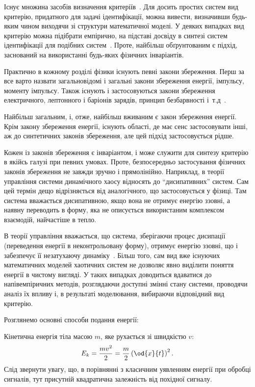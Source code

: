 Існує множина засобів визначення
критеріїв~\cite{atu_asau11,atu_asau12,atu_asau14,atu_khar_autodor25,atu_asau18,atu_st79,atu_apir2013}.
Для досить простих систем вид критерію, придатного для задачі ідентифікації,
можна вивести, визначивши будь-яким чином виходячи зі структури математичної
моделі. У деяких випадках вид критерію можна підібрати емпірично, на
підставі досвіду в синтезі систем ідентифікації для подібних систем~\cite{atu_asau24}. Проте,
найбільш обґрунтованим є підхід, заснований на використанні будь-яких фізичних
інваріантів.



Практично в кожному розділі фізики існують певні закони
збереження. Перш за все варто назвати загальновідомі і загальні
закони збереження енергії, імпульсу, моменту імпульсу. Також
існують і застосовуються закони збереження електричного,
лептонного і баріонів зарядів, принцип безбарвності
і~т.д~\cite{vigner_invar}.

Найбільш загальним, і, отже, найбільш вживаним є закон збереження енергії.
Крім закону збереження енергії, існують області, де має сенс
застосовувати інші, аж до синтетичних законів збереження, але
цей підхід застосовується рідше.

Кожен із законів збереження є інваріантом, і може служити для
синтезу критерію в якійсь галузі при певних умовах. Проте,
безпосередньо застосування фізичних законів збереження не
завжди зручно і прямолінійно. Наприклад, в теорії управління
системи динамічного хаосу відносять до ``дисипативних''
систем. Сам цей термін дещо відрізняється від аналогічного, що
застосовується у фізиці. Там система вважається дисипативною,
якщо вона не отримує енергію ззовні,
а наявну переводить в форму, яка не
описується використаним комплексом взаємодій, найчастіше
в тепло.

В теорії управління вважається, що система, зберігаючи
процес дисипації (переведення енергії в неконтрольовану
форму), отримує енергію ззовні, що і забезпечує її незатухаючу
динаміку~\cite{prigogine_selforganization, chernavskii_syn_info, prigogine_order_from_chaos}. Більш
того, сам вид вже існуючих математичних моделей хаотичних систем
не дозволяє явно виділити поняття енергії в чистому вигляді. У
таких випадках доводиться вдаватися до напівемпіричних методів,
розглядаючи доступні змінні стану системи, проводячи аналіз
їх впливу і, в результаті моделювання, вибираючи відповідний
вид критерію.


Розглянемо основні способи подання енергії:

Кінетична енергія тіла масою $m$, яке рухається зі швидкістю $v$:
%
\begin{equation}
  E_k = \frac{mv^2}{2} = \frac{m}{2} \left( \od{x}{t} \right)^2.
  \label{atu:eq:Ek_v}
\end{equation}
%
Слід звернути увагу, що, в порівнянні з класичним уявленням
енергії при обробці сигналів, тут присутній квадратична
залежність від похідної сигналу.


